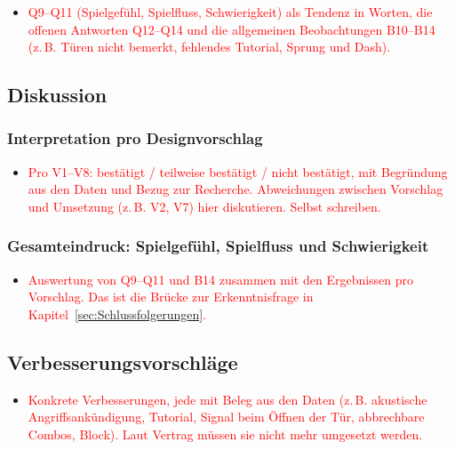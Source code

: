 \documentclass[../Main.tex]{subfiles}
\begin{document}
\begin{itemize}[leftmargin=1.5cm]
    \item \textcolor{red}{Q9--Q11 (Spielgefühl, Spielfluss, Schwierigkeit) als Tendenz in Worten, die offenen Antworten Q12--Q14 und die allgemeinen Beobachtungen B10--B14 (z.\,B. Türen nicht bemerkt, fehlendes Tutorial, Sprung und Dash).}
\end{itemize}

\subsection{Diskussion}

\subsubsection{Interpretation pro Designvorschlag} \label{sec:Interpretation}

\begin{itemize}[leftmargin=1.5cm]
    \item \textcolor{red}{Pro V1--V8: bestätigt / teilweise bestätigt / nicht bestätigt, mit Begründung aus den Daten und Bezug zur Recherche. Abweichungen zwischen Vorschlag und Umsetzung (z.\,B. V2, V7) hier diskutieren. Selbst schreiben.}
\end{itemize}

\subsubsection{Gesamteindruck: Spielgefühl, Spielfluss und Schwierigkeit} \label{sec:Gesamteindruck}

\begin{itemize}[leftmargin=1.5cm]
    \item \textcolor{red}{Auswertung von Q9--Q11 und B14 zusammen mit den Ergebnissen pro Vorschlag. Das ist die Brücke zur Erkenntnisfrage in Kapitel~\ref{sec:Schlussfolgerungen}.}
\end{itemize}

\subsection{Verbesserungsvorschläge} \label{sec:Verbesserungen}

\begin{itemize}[leftmargin=1.5cm]
    \item \textcolor{red}{Konkrete Verbesserungen, jede mit Beleg aus den Daten (z.\,B. akustische Angriffsankündigung, Tutorial, Signal beim Öffnen der Tür, abbrechbare Combos, Block). Laut Vertrag müssen sie nicht mehr umgesetzt werden.}
\end{itemize}
\end{document}
